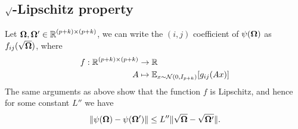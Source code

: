 \subsection{$\surd$-Lipschitz property}

Let $\bm{\Omega}, \bm{\Omega}' \in \operatorname{\mathbb{R}}^{(p+k)\times(p+k)}$, we can write the $(i, j)$ coefficient of $\psi(\bm{\Omega})$ as $f_{ij}(\sqrt{\bm{\Omega}}) $, where 
\begin{align*} 
    f:  \operatorname{\mathbb{R}}^{(p+k)\times(p+k)} &\to \operatorname{\mathbb{R}}\\
        A &\mapsto \operatorname{\mathbb{E}}_{x \sim \mathcal {{\cal N}}(0, I_{p+k})} [g_{ij}(Ax)]
\end{align*}
The same arguments as above show that the function $f$ is Lipschitz, and hence for some constant $L''$ we have
\[ \lVert\psi(\bm{\Omega}) - \psi(\bm{\Omega}')\rVert \leq L'' \lVert \sqrt{\bm{\Omega}} - \sqrt{\bm{\Omega}'} \rVert. \]